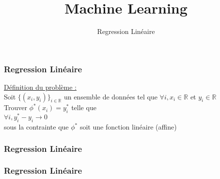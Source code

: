 \documentclass{formation}
\title{Machine Learning}
\subtitle{Regression Linéaire}
\begin{document}
\maketitle

\begin{frame}
  \frametitle{Regression Linéaire}
  \underline{Définition du problème :}\\
  \newline
  Soit $\{( x_i , y_i)\}_{i \in \mathbb{R}}$ un ensemble de données tel que $\forall i, x_i \in \mathbb{R}$ et $y_i \in \mathbb{R}$ \\
  \newline
  Trouver $\phi^*(x_i) = y_i^*$ telle que \\
  \newline
  $\forall i, y^*_i-y_i \rightarrow 0$ \\
  sous la contrainte que $\phi^*$ soit une fonction linéaire (affine)
\end{frame}

\begin{frame}
  \frametitle{Regression Linéaire}
\end{frame}

\begin{frame}
  \frametitle{Regression Linéaire}
\end{frame}
\end{document}

